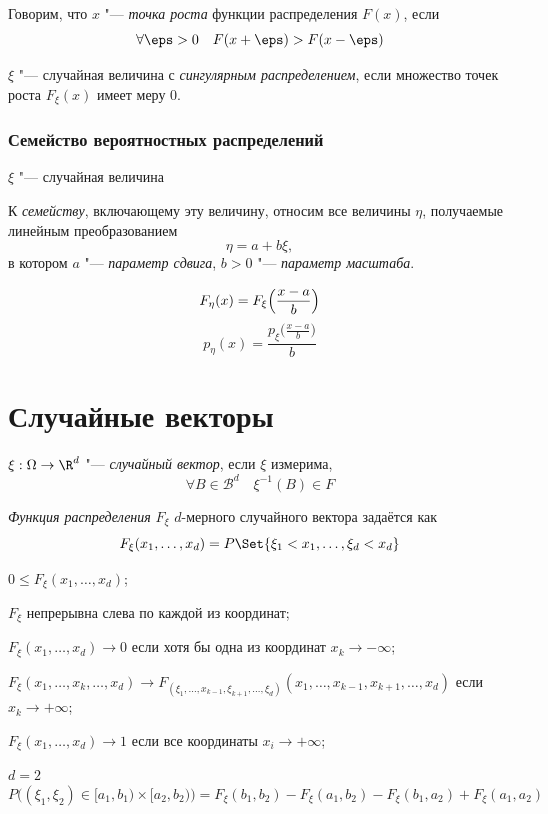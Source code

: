 \begin{definition}
	Говорим, что $ x $ "--- \emph{точка роста} функции распределения $ F(x) $, если
	$$ \forall \eps > 0 \quad F(x + \eps) > F(x - \eps) $$
\end{definition}

\begin{definition}
	$ \xi $ "--- случайная величина с \emph{сингулярным распределением}, если множество точек роста
	$ F_\xi(x) $ имеет меру 0.
\end{definition}

\subsubsection{Семейство вероятностных распределений}

\begin{definition}
	$ \xi $ "--- случайная величина

	К \emph{семейству}, включающему эту величину, относим все величины $ \eta $, получаемые линейным
	преобразованием
	$$ \eta = a + b \xi, $$
	в котором $ a $ "--- \emph{параметр сдвига}, $ b > 0 $ "--- \emph{параметр масштаба}.

	$$ F_\eta(x) = F_\xi \Bigl( \frac{x - a}b \Bigr) $$
	$$ p_\eta(x) = \frac{p_\xi \bigl( \frac{x - a}b \bigr)}b $$
\end{definition}

\section{Случайные векторы}

\begin{definition}
	$ \xi : \Omega \to \R^d $ "--- \emph{случайный вектор}, если $ \xi $ измерима, \ie
	$$ \forall B \in \mathcal B^d \quad \xi^{-1}(B) \in F $$
\end{definition}

\begin{definition}
	\emph{Функция распределения} $ F_\xi $ $ d $-мерного случайного вектора задаётся как
	$$ F_\xi(x_1, \dots, x_d) = P\Set{\xi_1 < x_1, \dots, \xi_d < x_d} $$
\end{definition}

\begin{props}
\item $ 0 \le F_\xi(x_1, \dots, x_d) $;
\item $ F_\xi $ непрерывна слева по каждой из координат;
\item $ F_\xi(x_1, \dots, x_d) \to 0 $ если хотя бы одна из координат $ x_k \to -\infty $;
\item $ F_\xi(x_1, \dots, x_k, \dots, x_d) \to
	F_{(\xi_1, \dots, x_{k - 1}, \xi_{k + 1}, \dots, \xi_d)}
	(x_1, \dots, x_{k - 1}, x_{k + 1}, \dots, x_d) $ если $ x_k \to +\infty $;
\item $ F_\xi(x_1, \dots, x_d) \to 1 $ если все координаты $ x_i \to +\infty $;
\item $ d = 2 $
	$$ P \bigl( (\xi_1, \xi_2) \in [a_1, b_1) \times [a_2, b_2) \bigr) =
	F_\xi(b_1, b_2) - F_\xi(a_1, b_2) - F_\xi(b_1, a_2) + F_\xi(a_1, a_2) $$
\end{props}

